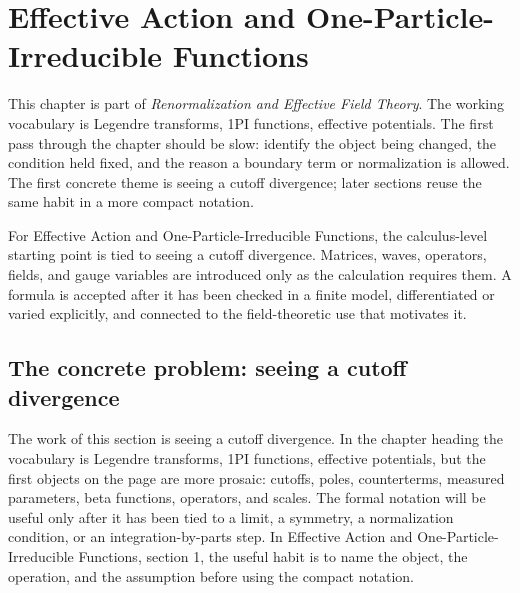 \chapter{Effective Action and One-Particle-Irreducible Functions}


This chapter is part of \emph{Renormalization and Effective Field Theory}.  The working vocabulary is Legendre transforms, 1PI functions, effective potentials.  The first pass through the chapter should be slow: identify the object being changed, the condition held fixed, and the reason a boundary term or normalization is allowed.  The first concrete theme is seeing a cutoff divergence; later sections reuse the same habit in a more compact notation.

For Effective Action and One-Particle-Irreducible Functions, the calculus-level starting point is tied to seeing a cutoff divergence.  Matrices, waves, operators, fields, and gauge variables are introduced only as the calculation requires them.  A formula is accepted after it has been checked in a finite model, differentiated or varied explicitly, and connected to the field-theoretic use that motivates it.

\section{The concrete problem: seeing a cutoff divergence}













The work of this section is seeing a cutoff divergence.  In the chapter heading the vocabulary is Legendre transforms, 1PI functions, effective potentials, but the first objects on the page are more prosaic: cutoffs, poles, counterterms, measured parameters, beta functions, operators, and scales.  The formal notation will be useful only after it has been tied to a limit, a symmetry, a normalization condition, or an integration-by-parts step.  In Effective Action and One-Particle-Irreducible Functions, section 1, the useful habit is to name the object, the operation, and the assumption before using the compact notation.

